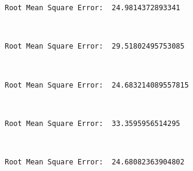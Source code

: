 \documentclass[11pt]{article}
\begin{document}
    \begin{Verbatim}[commandchars=\\\{\}]
Root Mean Square Error:  24.9814372893341
    \end{Verbatim}

    \begin{center}
    \end{center}
    { \hspace*{\fill} \\}
    
    \begin{Verbatim}[commandchars=\\\{\}]
Root Mean Square Error:  29.51802495753085
    \end{Verbatim}

    \begin{center}
    \end{center}
    { \hspace*{\fill} \\}
    
    \begin{Verbatim}[commandchars=\\\{\}]
Root Mean Square Error:  24.683214089557815
    \end{Verbatim}

    \begin{center}
    \end{center}
    { \hspace*{\fill} \\}
    
    \begin{Verbatim}[commandchars=\\\{\}]
Root Mean Square Error:  33.3595956514295
    \end{Verbatim}

    \begin{center}
    \end{center}
    { \hspace*{\fill} \\}
    
    \begin{Verbatim}[commandchars=\\\{\}]
Root Mean Square Error:  24.68082363904802
    \end{Verbatim}
\end{document}
